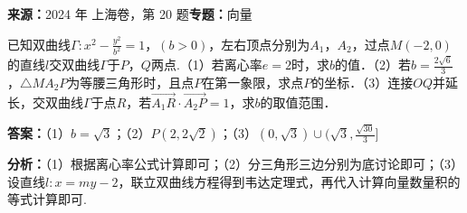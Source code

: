 \begin{question}[points=18]
\textbf{来源：}2024 年 上海卷，第 20 题\quad \textbf{专题：}向量\par
已知双曲线$\Gamma:x^2-\frac{y^2}{b^2}=1$，$(b>0)$，左右顶点分别为$A_1$，$A_2$，过点$M(-2,0)$的直线$l$交双曲线$\Gamma$于$P$，$Q$两点.（1）若离心率$e=2$时，求$b$的值．（2）若$b=\frac{2\sqrt6}{3}$，$\triangle MA_2P$为等腰三角形时，且点$P$在第一象限，求点$P$的坐标．（3）连接$OQ$并延长，交双曲线$\Gamma$于点$R$，若$\overrightarrow{A_1R}\cdot\overrightarrow{A_2P}=1$，求$b$的取值范围．
\begin{solution}
\textbf{答案：}（1）$b=\sqrt3$；（2）$P(2,2\sqrt2)$；（3）$(0,\sqrt3)\cup(\sqrt3,\frac{\sqrt{30}}{3}]$

\textbf{分析：}（1）根据离心率公式计算即可；（2）分三角形三边分别为底讨论即可；（3）设直线$l:x=my-2$，联立双曲线方程得到韦达定理式，再代入计算向量数量积的等式计算即可.


\end{solution}
\end{question}
